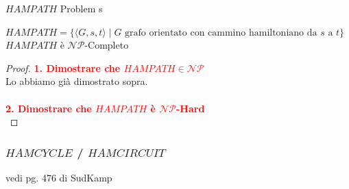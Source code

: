 \documentclass{article}  %
\theoremstyle{definition}
\begin{document}
\begin{theorem}{$HAMPATH$ Problem}
	s\footnotesize
	\begin{center}
		$HAMPATH = \{\langle G,s,t \rangle \mid G \text{ grafo orientato con cammino hamiltoniano da } s \text{ a } t\}$ \\
		$HAMPATH$ è $\mathcal{NP}$-Completo
	\end{center}
	\begin{proof}
		\textcolor{red}{\textbf{1. Dimostrare che $HAMPATH \in \mathcal{NP}$}} \\
		Lo abbiamo già dimostrato sopra. \\ \\
		\textcolor{red}{\textbf{2. Dimostrare che $HAMPATH$ è $\mathcal{NP}$-Hard}} \\
	\end{proof}
\end{theorem}
\subsubsection{$HAMCYCLE$ / $HAMCIRCUIT$}
vedi pg. 476 di SudKamp
\end{document}

